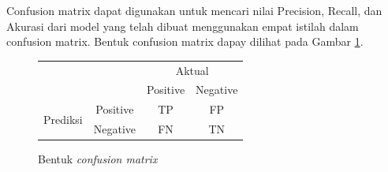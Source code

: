 Confusion matrix dapat digunakan untuk mencari nilai Precision, Recall, dan Akurasi dari model yang telah dibuat menggunakan empat istilah dalam confusion matrix. Bentuk confusion matrix dapay dilihat pada Gambar \ref{fig:bentukconfusionmatrix}. 


\begin{figure}[H]
  \begin{tabular}{|cc|cc|}
    \hline
    \multicolumn{2}{|c|}{\multirow{2}{*}{}}                    & \multicolumn{2}{c|}{Aktual}              \\ \cline{3-4} 
    \multicolumn{2}{|c|}{}                                     & \multicolumn{1}{c|}{Positive} & Negative \\ \hline
    \multicolumn{1}{|c|}{\multirow{2}{*}{Prediksi}} & Positive & \multicolumn{1}{c|}{TP}       & FP       \\ \cline{2-4} 
    \multicolumn{1}{|c|}{}                          & Negative & \multicolumn{1}{c|}{FN}       & TN       \\ \hline
    \end{tabular}
    \centering
    \caption{Bentuk \emph{confusion matrix}}
    \label{fig:bentukconfusionmatrix}
\end{figure}




